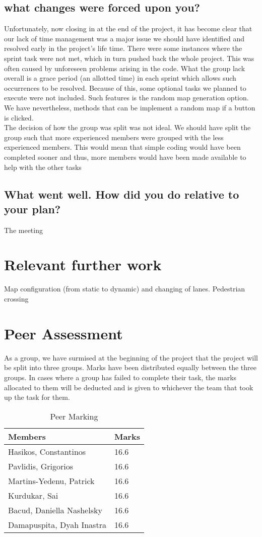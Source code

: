 \documentclass{article}[11pt,Tahoma]
\begin{document}
		\subsection{what changes were forced upon you? }
			Unfortunately, now closing in at the end of the project, it has become clear that our lack of time management was a major issue we should have identified and resolved early in the project's life time. There were some instances where the sprint task were not met, which in turn pushed back the whole project. This was often caused by  unforeseen problems arising in the code. What the group lack overall is a grace period (an allotted time) in each sprint which allows such occurrences to be resolved. Because of this, some optional tasks we planned to execute were not included. Such features is the random map generation option.  We have nevertheless, methods that can be implement a random map if a button is clicked. \\
			The decision of how the group was split was not ideal. We should have split the group such that more experienced members were grouped with the less experienced members.  This would mean that simple  coding would have been completed sooner and thus, more members would have been made available to help with the other tasks
		\subsection{What went well.  How did you do relative to your plan?}
		The meeting 	
	\section{Relevant further work}  
			Map configuration (from static to dynamic) and changing of lanes. Pedestrian crossing
	\section{Peer Assessment}
		As a group, we have surmised at the beginning of the project that the project will be split into three groups.  Marks have been distributed equally between the three groups. In cases where a group has failed to complete their task, the marks allocated to them will be deducted and is given to whichever the team that took up the task for them.
		\begin{table}[h]
		\centering
    	\begin{tabular}{|l|l|}
    		\hline
    		\textbf{Members}                   & \textbf{Marks} \\ \hline
    		Hasikos, Constantinos     & 16.6  \\ \hline
    		Pavlidis, Grigorios       & 16.6  \\ \hline
    		Martins-Yedenu, Patrick   & 16.6  \\ \hline
    		Kurdukar, Sai             & 16.6  \\ \hline
    		Bacud, Daniella Nashelsky & 16.6  \\ \hline
    		Damapuspita, Dyah Inastra & 16.6  \\ \hline
    	\end{tabular}
    	\caption {Peer Marking}
		\end{table}
\end{document}
